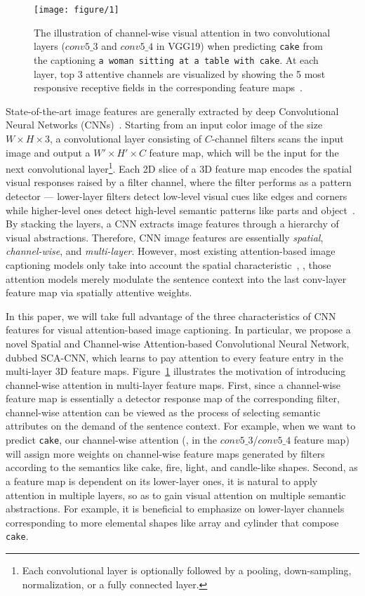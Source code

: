 \documentclass[10pt,twocolumn,letterpaper]{article}
\begin{document}
\begin{figure}
	\centering
	\texttt{[image: figure/1]}
	\caption{The illustration of channel-wise visual attention in two convolutional layers ($conv5\_3$ and $conv5\_4$ in VGG19) when predicting \texttt{cake} from the captioning \texttt{a woman sitting at a table with cake}. At each layer, top 3 attentive channels are visualized by showing the 5 most responsive receptive fields in the corresponding feature maps~\cite{zeiler2014visualizing}.}
	\label{fig:1}
\end{figure}State-of-the-art image features are generally extracted by deep Convolutional Neural Networks (CNNs)~\cite{he2015deep,simonyan2014very,wei2015hcp}. Starting
from an input color image of the size $W\times H\times3$, a convolutional layer consisting of $C$-channel filters scans the input image and output a $W'\times
H'\times C$ feature map, which will be the input for the next convolutional layer\footnote[1]{Each convolutional layer is optionally followed by a pooling,
down-sampling, normalization, or a fully connected layer.}. Each 2D slice of a 3D feature map encodes the spatial visual responses raised by a filter channel,
where the filter performs as a pattern detector --- lower-layer filters detect low-level visual cues like edges and corners while higher-level ones detect
high-level semantic patterns like parts and object~\cite{zeiler2014visualizing}. By stacking the layers, a CNN extracts image features through a hierarchy of
visual abstractions. Therefore, CNN image features are essentially \textit{spatial}, \textit{channel-wise}, and \textit{multi-layer}. However, most existing
attention-based image captioning models only take into account the spatial characteristic~\cite{xu2015show}, \ie, those attention models merely modulate the
sentence context into the last conv-layer feature map via spatially attentive weights.

In this paper, we will take full advantage of the three characteristics of CNN features for visual attention-based image captioning. In particular, we propose
a novel Spatial and Channel-wise Attention-based Convolutional Neural Network, dubbed SCA-CNN, which learns to pay attention to every feature entry in the
multi-layer 3D feature maps. Figure~\ref{fig:1} illustrates the motivation of introducing channel-wise attention in multi-layer feature maps. First, since a
channel-wise feature map is essentially a detector response map of the corresponding filter, channel-wise attention can be viewed as the process of selecting
semantic attributes on the demand of the sentence context. For example, when we want to predict \texttt{cake}, our channel-wise attention (\eg, in the
$conv5\_3$/$conv5\_4$ feature map) will assign more weights on channel-wise feature maps generated by filters according to the semantics like cake, fire,
light, and candle-like shapes. Second, as a feature map is dependent on its lower-layer ones, it is natural to apply attention in multiple layers, so as to
gain visual attention on multiple semantic abstractions. For example, it is beneficial to emphasize on lower-layer channels corresponding to more elemental
shapes like array and cylinder that compose \texttt{cake}.
\end{document}
